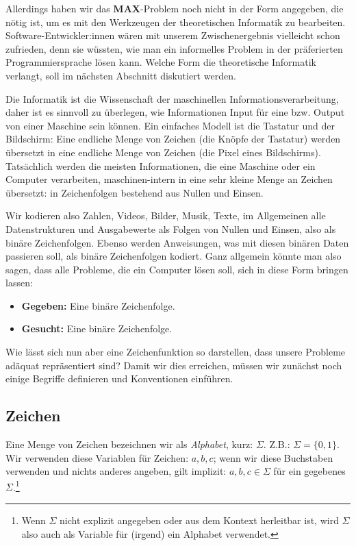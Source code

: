 Allerdings haben wir das \textbf{MAX}-Problem noch nicht in der Form angegeben,
die nötig ist, um es mit den Werkzeugen der theoretischen Informatik zu bearbeiten.
Software-Entwickler:innen wären mit unserem Zwischenergebnis vielleicht schon zufrieden,
denn sie wüssten, wie man ein informelles Problem
in der präferierten Programmiersprache lösen kann.
Welche Form die theoretische Informatik verlangt, soll im nächsten Abschnitt diskutiert werden.



Die Informatik ist die Wissenschaft der maschinellen Informationsverarbeitung,
daher ist es sinnvoll zu überlegen,
wie Informationen Input für eine bzw. Output von einer Maschine sein können.
Ein einfaches Modell ist die Tastatur und der Bildschirm:
Eine endliche Menge von Zeichen (die Knöpfe der Tastatur) werden übersetzt in eine
endliche Menge von Zeichen (die Pixel eines Bildschirms).
Tatsächlich werden die meisten Informationen,
die eine Maschine oder ein Computer verarbeiten,
maschinen-intern in eine sehr kleine Menge an Zeichen übersetzt:
in Zeichenfolgen bestehend aus Nullen und Einsen.

Wir kodieren also Zahlen, Videos, Bilder, Musik, Texte, im Allgemeinen alle Datenstrukturen
und Ausgabewerte als Folgen von Nullen und Einsen,
also als binäre Zeichenfolgen.
Ebenso werden Anweisungen, was mit diesen binären Daten passieren soll,
als binäre Zeichenfolgen kodiert.
Ganz allgemein könnte man also sagen, dass alle Probleme, die ein Computer lösen soll,
sich in diese Form bringen lassen:
\begin{itemize}
    \item \textbf{Gegeben:} Eine binäre Zeichenfolge.
    \item \textbf{Gesucht:} Eine binäre Zeichenfolge.
\end{itemize}

Wie lässt sich nun aber eine Zeichenfunktion so darstellen,
dass unsere Probleme adäquat repräsentiert sind?
Damit wir dies erreichen,
müssen wir zunächst noch einige Begriffe definieren und Konventionen einführen.

\subsection{Zeichen}

Eine Menge von Zeichen bezeichnen wir als \emph{Alphabet}, kurz: $\Sigma$.
Z.B.: $\Sigma = \{0,1\}$.\\

\noindent
Wir verwenden diese Variablen für Zeichen: $a,b,c$;
wenn wir diese Buchstaben verwenden und nichts anderes angeben,
gilt implizit: $a, b, c \in \Sigma$ für ein gegebenes $\Sigma$.\footnote{
Wenn $\Sigma$ nicht explizit angegeben oder aus dem Kontext herleitbar ist,
wird $\Sigma$ also auch als Variable für (irgend) ein Alphabet verwendet.}\\

